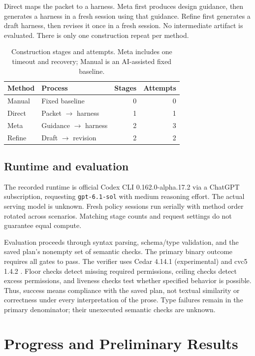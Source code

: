\documentclass[11pt]{article}
\begin{document}
Direct maps the packet to a harness. Meta first produces design guidance, then generates a harness in a fresh session using that guidance. Refine first generates a draft harness, then revises it once in a fresh session. No intermediate artifact is evaluated. There is only one construction repeat per method.

\begin{table}[t]
\centering
\setlength{\tabcolsep}{4pt}
\begin{tabular}{@{}llrr@{}}
\toprule
Method & Process & Stages & Attempts \\
\midrule
Manual & Fixed baseline & 0 & 0 \\
Direct & Packet $\to$ harness & 1 & 1 \\
Meta & Guidance $\to$ harness & 2 & 3 \\
Refine & Draft $\to$ revision & 2 & 2 \\
\bottomrule
\end{tabular}
\caption{Construction stages and attempts. Meta includes one timeout and recovery; Manual is an AI-assisted fixed baseline.}
\label{tab:methods}
\end{table}

\subsection{Runtime and evaluation}
The recorded runtime is official Codex CLI 0.162.0-alpha.17.2 via a ChatGPT subscription, requesting \texttt{gpt-6.1-sol} with medium reasoning effort. The actual serving model is unknown. Fresh policy sessions run serially with method order rotated across scenarios. Matching stage counts and request settings do not guarantee equal compute.

Evaluation proceeds through syntax parsing, schema/type validation, and the saved plan's nonempty set of semantic checks. The primary binary outcome requires all gates to pass. The verifier uses Cedar 4.14.1 (experimental) and cvc5 1.4.2 \citep{barbosa2022cvc5}. Floor checks detect missing required permissions, ceiling checks detect excess permissions, and liveness checks test whether specified behavior is possible. Thus, success means compliance with the saved plan, not textual similarity or correctness under every interpretation of the prose. Type failures remain in the primary denominator; their unexecuted semantic checks are unknown.

\section{Progress and Preliminary Results}
\end{document}
